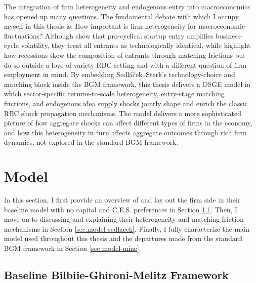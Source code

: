 \documentclass[a4paper,12pt]{article} %
\numberwithin{equation}{section} %
\numberwithin{figure}{section}
\numberwithin{table}{section}
\begin{document}
The integration of firm heterogeneity and endogenous entry into macroeconomics has opened up many questions. The fundamental debate with which I occupy myself
in this thesis is: How important is firm heterogeneity for macroeconomic fluctuations? Although \textcite{bilbiie2012endogenous} show that 
pro-cyclical startup entry amplifies business-cycle volatility, they treat all entrants as technologically identical, while \textcite{sedlavcek2017growth} 
highlight how recessions skew the composition of entrants through matching frictions but do so outside a love-of-variety RBC setting and with a different question of
firm employment in mind. By embedding Sedláček–Sterk’s technology-choice and matching block inside the BGM framework, 
this thesis delivers a DSGE model in which sector-specific returns-to-scale heterogeneity, entry-stage matching frictions, and endogenous idea supply shocks jointly shape 
and enrich the classic RBC shock propagation mechanisms. The model delivers a more sophisticated picture of how aggregate shocks can affect different types of firms in the economy, and
how this heterogeneity in turn affects aggregate outcomes through rich firm dynamics, not explored in the standard BGM framework.


\section{Model}
\label{sec:model}

In this section, I first provide an overview of \textcite{bilbiie2012endogenous} and lay out the firm side in their baseline model with no capital and C.E.S. 
preferences in Section \ref{sec:model-bilbiie}. Then, I move on to discussing \textcite{sedlavcek2017growth} and explaining their
heterogeneity and matching friction mechanisms in Section \ref{sec:model-sedlacek}. Finally, I fully characterize the main model used throughout this 
thesis and the departures made from the standard BGM framework in Section \ref{sec:model-mine}. 

\subsection{Baseline Bilbiie-Ghironi-Melitz Framework}
\label{sec:model-bilbiie}
\end{document}
